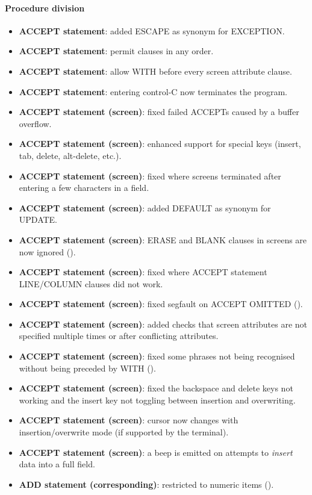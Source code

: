 \paragraph{Procedure division}
\begin{itemize}
\item \textbf{ACCEPT statement}: added ESCAPE as synonym for EXCEPTION.
\item \textbf{ACCEPT statement}: permit clauses in any order.
\item \textbf{ACCEPT statement}: allow WITH before every screen attribute clause.
\item \textbf{ACCEPT statement}: entering control-C now terminates the program.
\item \textbf{ACCEPT statement (screen)}: fixed failed ACCEPTs caused by a buffer overflow.
\item \textbf{ACCEPT statement (screen)}: enhanced support for special keys (insert, tab, delete, alt-delete, etc.).
\item \textbf{ACCEPT statement (screen)}: fixed  where screens terminated after entering a few characters in a field.
\item \textbf{ACCEPT statement (screen)}: added DEFAULT as synonym for UPDATE.
\item \textbf{ACCEPT statement (screen)}: ERASE and BLANK clauses in screens are now ignored ().
\item \textbf{ACCEPT statement (screen)}: fixed  where ACCEPT statement LINE\slash{}COLUMN clauses did not work.
\item \textbf{ACCEPT statement (screen)}: fixed segfault on ACCEPT OMITTED ().
\item \textbf{ACCEPT statement (screen)}: added checks that screen attributes are not specified multiple times or after conflicting attributes.
\item \textbf{ACCEPT statement (screen)}: fixed some phrases not being recognised without being preceded by WITH ().
\item \textbf{ACCEPT statement (screen)}: fixed the backspace and delete keys not working and the insert key not toggling between insertion and overwriting.
\item \textbf{ACCEPT statement (screen)}: cursor now changes with insertion\slash{}overwrite mode (if supported by the terminal).
\item \textbf{ACCEPT statement (screen)}: a beep is emitted on attempts to \emph{insert} data into a full field.
\item \textbf{ADD statement (corresponding)}: restricted to numeric items ().

\end{itemize}

